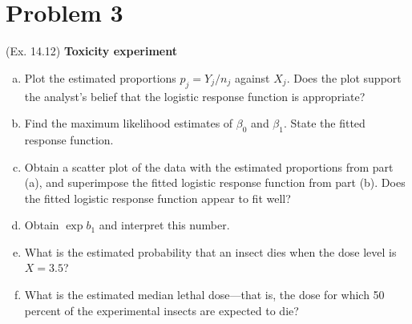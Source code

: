 \documentclass[10pt]{report}
\begin{document}
\section*{Problem 3}
(Ex. 14.12) \textbf{Toxicity experiment}
\begin{enumerate}[a.]
	\item 
	Plot the estimated proportions $p_j = Y_j / n_j$ against $X_j$. Does the plot support the analyst's belief that the logistic response function is appropriate?
	
	\item 
	Find the maximum likelihood estimates of $\beta_0$ and $\beta_1$. State the fitted response function.
	
	\item 
	Obtain a scatter plot of the data with the estimated proportions from part (a), and superimpose the fitted logistic response function from part (b). Does the fitted logistic response function appear to fit well?
	
	\item 
	Obtain $\exp{b_1}$ and interpret this number.
	
	\item 
	What is the estimated probability that an insect dies when the dose level is $X=3.5$?
	
	\item 
	What is the estimated median lethal dose---that is, the dose for which 50 percent of the experimental insects are expected to die?
\end{enumerate}
\end{document}
